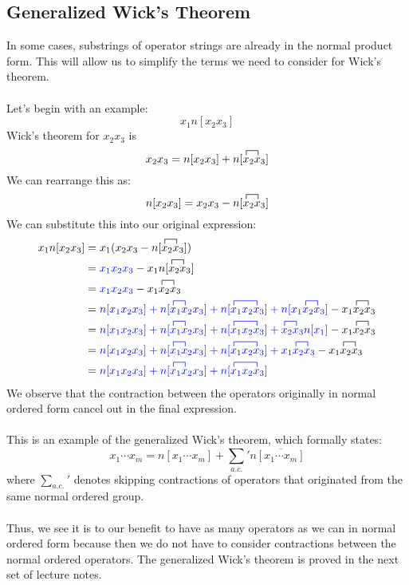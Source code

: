 \documentclass{article}
\newcommand{\ol}{\overline}
\newcommand{\cd}{\ensuremath{\cdots} }
\begin{document}
\subsection{Generalized Wick's Theorem}
In some cases, substrings of operator strings are already in the normal product form.
This will allow us to simplify the terms we need to consider for Wick's theorem. \\ \\
Let's begin with an example: 
\[x_1 n[x_2 x_3] \] 
Wick's theorem for $x_2 x_3$ is
\[ x_2 x_3 = n[x_2 x_3] +   n[\contraction{}{x}{{}_2}{x} x_2 x_3] \]
We can rearrange this as: 
\[n[x_2 x_3]  = x_2 x_3  - n[\contraction{}{x}{{}_2}{x} x_2 x_3]  \]
We can substitute this into our original expression: 
\begin{align*}
x_1 n[x_2 x_3] &= x_1 (x_2 x_3  - n[\contraction{}{x}{{}_2}{x} x_2 x_3] ) \\
&= {\color{blue} x_1 x_2 x_3} - x_1n[\contraction{}{x}{{}_2}{x} x_2 x_3] \\
&= {\color{blue} x_1 x_2 x_3} - x_1\contraction{}{x}{{}_2}{x} x_2 x_3 \\
&= {\color{blue} n[x_1x_2x_3] + n[\contraction{}{x}{{}_1}{x} x_1 x_2 x_3] +n[\contraction{}{x}{{}_1 x_2}{x} x_1 x_2 x_3] + n[\contraction{x_1}{x}{{}_2}{x} x_1 x_2 x_3] }  - x_1\contraction{}{x}{{}_2}{x} x_2 x_3 \\
&=  {\color{blue} n[x_1x_2x_3] + n[\contraction{}{x}{{}_1}{x} x_1 x_2 x_3] +n[\contraction{}{x}{{}_1 x_2}{x} x_1 x_2 x_3] + \contraction{}{x}{{}_2}{x} x_2 x_3 n[x_1] }  - x_1\contraction{}{x}{{}_2}{x} x_2 x_3 \\
&= {\color{blue} n[x_1x_2x_3] + n[\contraction{}{x}{{}_1}{x} x_1 x_2 x_3] +n[\contraction{}{x}{{}_1 x_2}{x} x_1 x_2 x_3] + x_1\contraction{}{x}{{}_2}{x} x_2 x_3  }  - x_1\contraction{}{x}{{}_2}{x} x_2 x_3 \\
&= \color{blue} n[x_1x_2x_3] + n[\contraction{}{x}{{}_1}{x} x_1 x_2 x_3] +n[\contraction{}{x}{{}_1 x_2}{x} x_1 x_2 x_3] 
\end{align*}
We observe that the contraction between the operators originally in normal ordered form cancel out in the final expression.
\\ \\
This is an example of the generalized Wick's theorem, which formally states: 
$$x_1 \cd x_m = n[x_1 \cd x_m ]  + \sum_{a.c.} {}' n\ol{[x_1 \cd x_m ]} $$
where $\sum_{a.c.} {}' $ denotes skipping contractions of operators that originated from the same normal ordered group. 
\\ \\
Thus, we see it is to our benefit to have as many operators as we can in normal ordered form because then we do not have to consider contractions between the normal ordered operators. 
The generalized Wick's theorem is proved in the next set of lecture notes.
\end{document}
